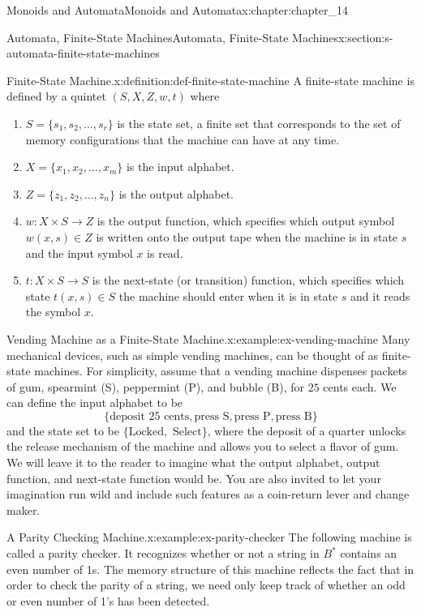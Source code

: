 \documentclass[twoside,10pt,]{book}
\numberwithin{equation}{section}
\begin{document}
\begin{chapterptx}{Monoids and Automata}{}{Monoids and Automata}{}{}{x:chapter:chapter_14}
\begin{sectionptx}{Automata, Finite-State Machines}{}{Automata, Finite-State Machines}{}{}{x:section:s-automata-finite-state-machines}
\begin{definition}{Finite-State Machine.}{x:definition:def-finite-state-machine}%
%
\label{g:notation:idm404598481296}%
A finite-state machine is defined by a quintet \((S, X, Z, w, t)\) where%
\begin{enumerate}[label=(\arabic*)]
\item{}\(S=\{s_1, s_2,\ldots  , s_r\}\) is the state set, a finite set that corresponds to the set of memory configurations that the machine can have at any time.%
\item{}\(X=\{x_1, x_2, \ldots  ,x_m\}\) is the input alphabet.%
\item{}\(Z=\{z_1,z_2, \ldots  ,z_n\}\) is the output alphabet.%
\item{}\(w: X\times S \to Z\) is the output function, which specifies which output symbol \(w(x, s) \in Z\) is written onto the output tape when the machine is in state \(s\) and the input symbol \(x\) is read.%
\item{}\(t:X\times S\to S\) is the next-state (or transition) function, which specifies which state \(t(x, s) \in S\) the machine should enter when it is in state \(s\) and it reads the symbol \(x\).%
\end{enumerate}
%
\end{definition}
\begin{example}{Vending Machine as a Finite-State Machine.}{x:example:ex-vending-machine}%
Many mechanical devices, such as simple vending machines, can be thought of as finite-state machines. For simplicity, assume that a vending machine dispenses packets of gum, spearmint (S), peppermint (P), and bubble (B), for \(25\) cents each. We can define the input alphabet to be%
\begin{equation*}
\{\textrm{deposit 25 cents}, \textrm{press S}, \textrm{press P}, \textrm{press B}\}
\end{equation*}
and the state set to be \(\{\textrm{Locked}, \textrm{ Select}\}\), where the deposit of a quarter unlocks the release mechanism of the machine and allows you to select a flavor of gum. We will leave it to the reader to imagine what the output alphabet, output function, and next-state function would be. You are also invited to let your imagination run wild and include such features as a coin-return lever and change maker.%
\end{example}
\begin{example}{A Parity Checking Machine.}{x:example:ex-parity-checker}%
The following machine is called a parity checker.  It recognizes whether or not a string in \(B^*\)  contains an even number of 1s. The memory structure of this machine reflects the fact that in order to check the parity of a string, we need only keep track of whether an odd or even number of 1's has been detected.%

\end{example}
\end{sectionptx}
\end{chapterptx}
\end{document}
